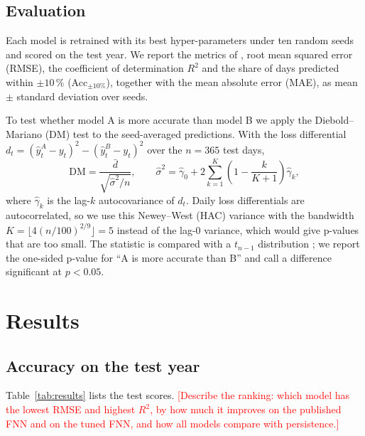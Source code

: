 \documentclass[conference]{IEEEtran}
\newcommand{\tbd}[1]{\textcolor{red}{[#1]}}
\begin{document}
\subsection{Evaluation}
Each model is retrained with its best hyper-parameters under ten random seeds and scored on
the test year. We report the metrics of \cite{long2026}, root mean squared error (RMSE), the
coefficient of determination $R^2$ and the share of days predicted within $\pm10\,\%$
(Acc$_{\pm10\%}$), together with the mean absolute error (MAE), as mean $\pm$ standard
deviation over seeds.

To test whether model A is more accurate than model B we apply the Diebold--Mariano (DM) test
\cite{diebold1995} to the seed-averaged predictions. With the loss differential
$d_t=(\hat{y}^A_t-y_t)^2-(\hat{y}^B_t-y_t)^2$ over the $n=365$ test days,
\begin{equation}
\mathrm{DM}=\frac{\bar{d}}{\sqrt{\hat{\sigma}^2/n}},\qquad
\hat{\sigma}^2=\hat{\gamma}_0+2\sum_{k=1}^{K}\left(1-\frac{k}{K+1}\right)\hat{\gamma}_k,
\end{equation}
where $\hat{\gamma}_k$ is the lag-$k$ autocovariance of $d_t$. Daily loss differentials are
autocorrelated, so we use this Newey--West (HAC) variance with the bandwidth
$K=\lfloor4(n/100)^{2/9}\rfloor=5$ \cite{newey1994} instead of the lag-0 variance, which would
give p-values that are too small. The statistic is compared with a $t_{n-1}$ distribution
\cite{harvey1997}; we report the one-sided p-value for ``A is more accurate than B'' and call a
difference significant at $p<0.05$.

\section{Results}\label{sec:results}

\subsection{Accuracy on the test year}
Table~\ref{tab:results} lists the test scores. \tbd{Describe the ranking: which model has the
lowest RMSE and highest $R^2$, by how much it improves on the published FNN and on the tuned
FNN, and how all models compare with persistence.}
\end{document}
